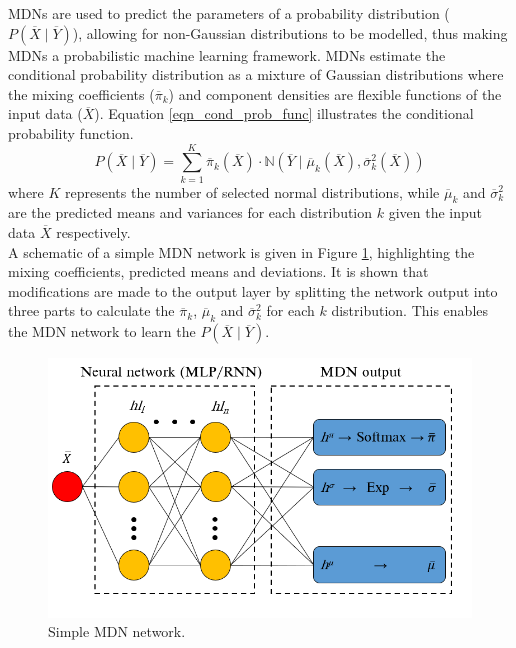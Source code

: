 \documentclass[a4paper,fleqn]{cas-sc}
\begin{document}
MDNs are used to predict the parameters of a probability distribution ($P(\overline{X}\mid\overline{Y})$), allowing for non-Gaussian distributions to be modelled, thus making MDNs a probabilistic machine learning framework. MDNs estimate the conditional probability distribution as a mixture of Gaussian distributions where the mixing coefficients ($\overline{\pi}_k$) and component densities are flexible functions of the input data ($\overline{X}$). Equation \ref{eqn_cond_prob_func} illustrates the conditional probability function.
\begin{equation}\label{eqn_cond_prob_func}
P(\overline{X}\mid\overline{Y}) = \sum_{k=1}^K\overline{\pi}_k(\overline{X})\cdot \mathbb{N}(\overline{Y}\mid \overline{\mu}_k(\overline{X}),\overline{\sigma}^2_k(\overline{X}))
\end{equation}
where $K$ represents the number of selected normal distributions, while $\overline{\mu}_k$ and $\overline{\sigma}^2_k$ are the predicted means and variances for each distribution $k$ given the input data $\overline{X}$ respectively.\\

A schematic of a simple MDN network is given in Figure \ref{fig_mdn_schematic}, highlighting the mixing coefficients, predicted means and deviations. It is shown that modifications are made to the output layer by splitting the network output into three parts to calculate the $\overline{\pi}_k$, $\overline{\mu}_k$ and $\overline{\sigma}^2_k$ for each $k$ distribution. This enables the MDN network to learn the $P(\overline{X}\mid\overline{Y})$.\\
\begin{figure}[h!]
	\centering
		\includegraphics[scale=0.5]{MDN_SCHEMATIC}
	  \caption{Simple MDN network.}\label{fig_mdn_schematic}
\end{figure}
\end{document}
